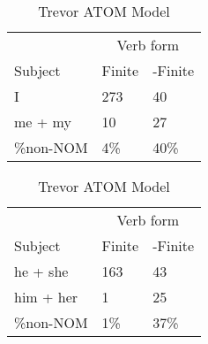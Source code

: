 \begin{table}[]
\caption{Trevor ATOM Model}
\begin{minipage}{0.5\textwidth}
    \centering
    \begin{tabular}{@{}lll@{}}
        \toprule
         & \multicolumn{2}{c}{Verb form}\\
         \cline{2-3}
        Subject & Finite & -Finite \\
        \midrule
        I & 273 & 40 \\
        me + my & 10 & 27 \\
        \hline
        \%non-NOM & 4\% & 40\% \\
        \bottomrule
    \end{tabular}
\end{minipage}
\begin{minipage}{0.5\textwidth}
    \centering
    \begin{tabular}{@{}lll@{}}
        \toprule
         & \multicolumn{2}{c}{Verb form}\\
         \cline{2-3}
        Subject & Finite & -Finite \\
        \midrule
        he + she & 163 & 43 \\
        him + her & 1 & 25 \\
        \hline
        \%non-NOM & 1\% & 37\% \\
        \bottomrule
    \end{tabular}
    \end{minipage}


\end{table}
